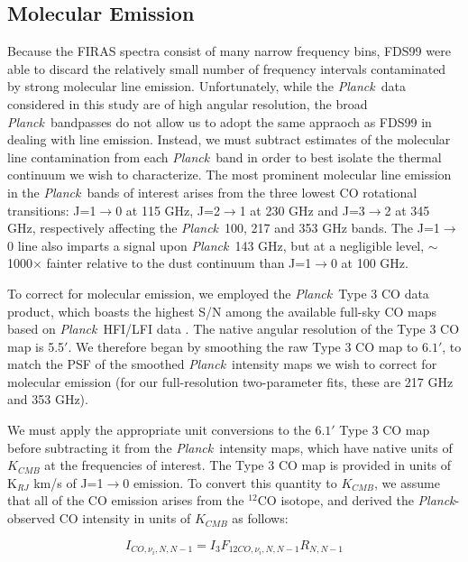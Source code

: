\documentclass{emulateapj}
\newcommand{\PLANCK}{{\it Planck}}
\begin{document}
\subsection{Molecular Emission}
Because the FIRAS spectra consist of many narrow frequency bins, FDS99 were
able to discard the relatively small number of frequency intervals contaminated
by strong molecular line emission. Unfortunately, while the \PLANCK~data 
considered in this study are of high angular resolution, the broad 
\PLANCK~bandpasses do not allow us to adopt the same appraoch as FDS99 in 
dealing with line emission. Instead, we must subtract estimates of the 
molecular line contamination from each \PLANCK~band in order to best isolate 
the thermal continuum we wish to characterize. The most prominent molecular 
line emission in the \PLANCK~bands of interest arises from the three lowest CO 
rotational transitions: J=1$\rightarrow$0 at 115 GHz, J=2$\rightarrow$1 at 230 
GHz and J=3$\rightarrow$2 at 345 GHz, respectively affecting the \PLANCK~100, 
217 and 353 GHz bands. The J=1$\rightarrow$0 line also imparts a signal upon 
\PLANCK~143 GHz, but at a negligible level, $\sim$1000$\times$ fainter relative
to the dust continuum than J=1$\rightarrow$0 at 100 GHz.

To correct for molecular emission, we employed the \PLANCK~Type 3 CO 
data product, which boasts the highest S/N 
among the available full-sky CO maps based on \PLANCK~HFI/LFI 
data \citep{planckco}. The native angular resolution of the Type 3 CO map is 
5.5$'$. We therefore began by smoothing the raw Type 3 CO map to $6.1'$, to 
match the PSF of the smoothed \PLANCK~intensity maps we wish to correct 
for molecular emission (for our full-resolution two-parameter fits, these are 
217 GHz and 353 GHz). 


We must apply the appropriate unit conversions to the $6.1'$ Type 3 CO
map before subtracting it from the \PLANCK~intensity maps, which have native 
units of $K_{CMB}$ at the frequencies of interest. The Type 3 CO map is 
provided in units of K$_{RJ}$ km/s of J=1$\rightarrow$0 emission. To convert 
this quantity to $K_{CMB}$, we assume that all of the CO emission arises from 
the $^{12}$CO isotope, and derived the \PLANCK-observed CO intensity in units 
of $K_{CMB}$ as follows:

\begin{equation}
I_{CO, \nu_i, N, N-1} = I_{3}F_{12CO, \nu_i, N, N-1} R_{N, N-1}
\end{equation}
\end{document}
